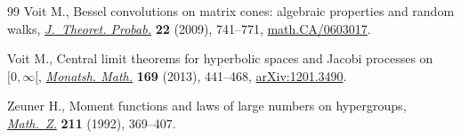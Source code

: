 \documentclass[pdftex]{sigma}
\numberwithin{equation}{section}
\begin{document}
\begin{thebibliography}{99}
Voit M., Bessel convolutions on matrix cones: algebraic properties and random
  walks, \href{http://dx.doi.org/10.1007/s10959-008-0186-2}{\textit{J.~Theoret. Probab.}} \textbf{22} (2009), 741--771,
  \href{http://arxiv.org/abs/math.CA/0603017}{math.CA/0603017}.

Voit M., Central limit theorems for hyperbolic spaces and {J}acobi processes on
  {$[0,\infty [$}, \href{http://dx.doi.org/10.1007/s00605-012-0460-3}{\textit{Monatsh. Math.}} \textbf{169} (2013), 441--468,
  \href{http://arxiv.org/abs/1201.3490}{arXiv:1201.3490}.

Zeuner H., Moment functions and laws of large numbers on hypergroups,
  \href{http://dx.doi.org/10.1007/BF02571436}{\textit{Math.~Z.}} \textbf{211} (1992), 369--407.

\end{thebibliography}\LastPageEnding
\end{document}
